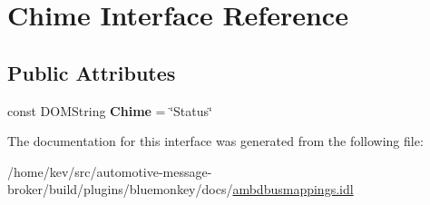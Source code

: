 \hypertarget{interfaceChime}{\section{Chime Interface Reference}
\label{interfaceChime}
}
\subsection*{Public Attributes}
\begin{DoxyCompactItemize}
\item 
\hypertarget{interfaceChime_a8c3a90e6372ac2fbef175e5b11d629a1}{const D\+O\+M\+String {\bfseries Chime} = \char`\"{}Status\char`\"{}}\label{interfaceChime_a8c3a90e6372ac2fbef175e5b11d629a1}

\end{DoxyCompactItemize}


The documentation for this interface was generated from the following file\+:\begin{DoxyCompactItemize}
\item 
/home/kev/src/automotive-\/message-\/broker/build/plugins/bluemonkey/docs/\hyperlink{ambdbusmappings_8idl}{ambdbusmappings.\+idl}\end{DoxyCompactItemize}
